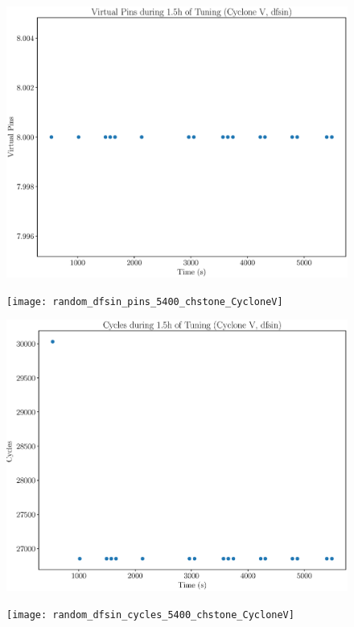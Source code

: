 \documentclass[12pt, a4paper]{article}
\begin{document}
\begin{figure}[htpb]
    \begin{minipage}{.48\textwidth}
        \includegraphics[scale=.25]{dfsin_pins_5400_chstone_CycloneV}
    \end{minipage}%
    \hfill
    \begin{minipage}{.48\textwidth}
        \texttt{[image: random\_dfsin\_pins\_5400\_chstone\_CycloneV]}
    \end{minipage}%

    \begin{minipage}{.48\textwidth}
        \includegraphics[scale=.25]{dfsin_cycles_5400_chstone_CycloneV}
    \end{minipage}%
    \hfill
    \begin{minipage}{.48\textwidth}
        \texttt{[image: random\_dfsin\_cycles\_5400\_chstone\_CycloneV]}
    \end{minipage}%
\end{figure}
\end{document}
